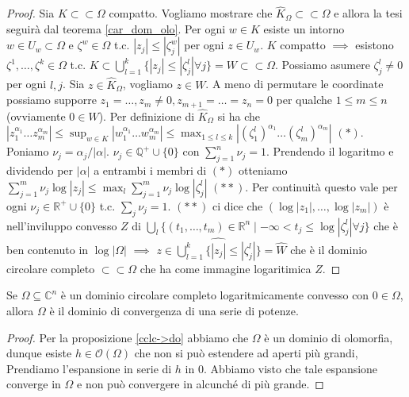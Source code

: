\begin{proof}
  Sia $K \subset\subset \Omega$ compatto. Vogliamo mostrare che $\hat{K}_\Omega \subset\subset \Omega$ e allora la tesi seguirà dal teorema \ref{car_dom_olo}. Per ogni $w \in K$ esiste un intorno $w \in U_w \subset \Omega$ e $\zeta^w \in \Omega$ t.c. $|z_j| \le |\zeta_j^w|$ per ogni $z \in U_w$.
  $K$ compatto $\implies$ esistono $\zeta^1, \dots, \zeta^k \in \Omega$ t.c. $\displaystyle K \subset \bigcup_{l=1}^k \{|z_j| \le |\zeta_j^l| \forall j\}=W \subset\subset \Omega$. Possiamo asumere $\zeta_j^l \not=0$ per ogni $l,j$. Sia $z \in \hat{K}_\Omega$, vogliamo $z \in W$.
  A meno di permutare le coordinate possiamo supporre $z_1= \dots, z_m \not=0, z_{m+1}=\dots=z_n=0$ per qualche $1 \le m \le n$ (ovviamente $0 \in W$).
  Per definizione di $\hat{K}_\Omega$ si ha che $\displaystyle |z_1^{\alpha_1}\dots z_m^{\alpha_m}| \le \sup_{w \in K} |w_1^{\alpha_1}\dots w_m^{\alpha_m}| \le \max_{1 \le l \le k} |(\zeta_1^l)^{\alpha_1}\dots(\zeta_m^l)^{\alpha_m}|$ $(*)$.
  Poniamo $\nu_j=\alpha_j/|\alpha|$. $\nu_j \in \mathbb{Q}^+\cup\{0\}$ con $\displaystyle \sum_{j=1}^n \nu_j=1$. Prendendo il logaritmo e dividendo per $|\alpha|$ a entrambi i membri di $(*)$ otteniamo $\displaystyle \sum_{j=1}^m \nu_j\log{|z_j|} \le \max_l \sum_{j=1}^m \nu_j\log{|\zeta_j^l|}$ $(**)$.
  Per continuità questo vale per ogni $\nu_j \in \mathbb{R}^+\cup\{0\}$ t.c. $\displaystyle \sum_j \nu_j=1$.
  $(**)$ ci dice che $(\log{|z_1|},\dots,\log{|z_m|})$ è nell'inviluppo convesso $Z$ di $\displaystyle \bigcup_l \{(t_1,\dots,t_m) \in \mathbb{R}^n \mid -\infty<t_j \le \log{|\zeta_j^l|}\forall j\}$ che è ben contenuto in $\log{|\Omega|}$ $\implies$ $\displaystyle z \in \widehat{\bigcup_{l=1}^k \{|z_j| \le |\zeta_j^l|\}}=\hat{W}$ che è il dominio circolare completo $\subset\subset \Omega$ che ha come immagine logaritimica $Z$.
\end{proof}

\begin{cor}
  Se $\Omega \subseteq \mathbb{C}^n$ è un dominio circolare completo logaritmicamente convesso con $0 \in \Omega$, allora $\Omega$ è il dominio di convergenza di una serie di potenze.
\end{cor}

\begin{proof}
  Per la proposizione \ref{cclc->do} abbiamo che $\Omega$ è un dominio di olomorfia, dunque esiste $h \in \mathcal{O}(\Omega)$ che non si può estendere ad aperti più grandi, Prendiamo l'espansione in serie di $h$ in $0$. Abbiamo visto che tale espansione converge in $\Omega$ e non può convergere in alcunché di più grande.
\end{proof}
